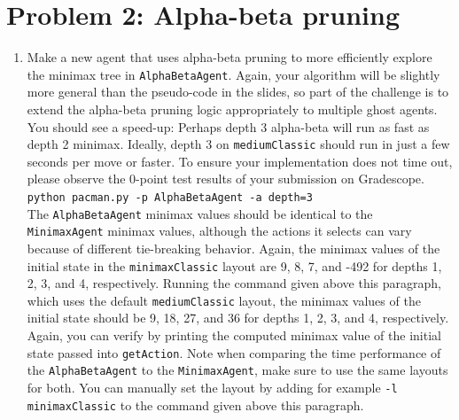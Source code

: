 \documentclass{article}
\theoremstyle{case}
\theoremstyle{definition}
\begin{document}
\newpage
\section*{Problem 2: Alpha-beta pruning}
\begin{enumerate}
    \item[a.]
    [10 points] Make a new agent that uses alpha-beta pruning to more efficiently explore the minimax tree in \texttt{AlphaBetaAgent}. Again, your algorithm will be slightly more general than the pseudo-code in the slides, so part of the challenge is to extend the alpha-beta pruning logic appropriately to multiple ghost agents. \\

    You should see a speed-up: Perhaps depth 3 alpha-beta will run as fast as depth 2 minimax. Ideally, depth 3 on \texttt{mediumClassic} should run in just a few seconds per move or faster. To ensure your implementation does not time out, please observe the 0-point test results of your submission on Gradescope. \\

    \texttt{python pacman.py -p AlphaBetaAgent -a depth=3} \\

    The \texttt{AlphaBetaAgent} minimax values should be identical to the \texttt{MinimaxAgent} minimax values, although the actions it selects can vary because of different tie-breaking behavior. Again, the minimax values of the initial state in the \texttt{minimaxClassic} layout are 9, 8, 7, and -492 for depths 1, 2, 3, and 4, respectively. Running the command given above this paragraph, which uses the default \texttt{mediumClassic} layout, the minimax values of the initial state should be 9, 18, 27, and 36 for depths 1, 2, 3, and 4, respectively. Again, you can verify by printing the computed minimax value of the initial state passed into \texttt{getAction}. Note when comparing the time performance of the \texttt{AlphaBetaAgent} to the \texttt{MinimaxAgent}, make sure to use the same layouts for both. You can manually set the layout by adding for example \texttt{-l minimaxClassic} to the command given above this paragraph.
\end{enumerate}

\newpage
\end{document}

